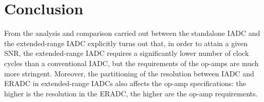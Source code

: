 \section{Conclusion}

From the analysis and comparison carried out between the standalone IADC and the extended-range IADC explicitly turns out that, in order to attain a given SNR, the extended-range IADC requires a significantly lower number of clock cycles than a conventional IADC, but the requirements of the op-amps are much more stringent. Moreover, the partitioning of the resolution between IADC and ERADC in extended-range IADCs also affects the op-amp specifications: the higher is the resolution in the ERADC, the higher are the op-amp requirements.


